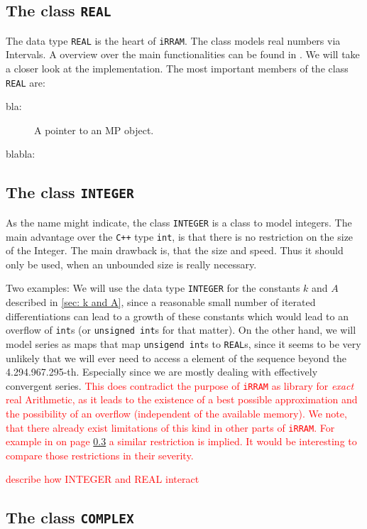 \documentclass{article}
\newcommand{\irram}{\texttt{iRRAM}\xspace}
\newcommand{\cc}{\texttt{C++}\xspace}
\newcommand{\ir}[1]{\texttt{#1}}
\newcommand{\code}[1]{\texttt{#1}}
\newcommand{\temp}[1]{\textcolor{red}{#1}}
\begin{document}
\subsection{The class \ir{REAL}}

The data type \ir{REAL} is the heart of \irram. The class models real numbers via Intervals. A overview over the main functionalities can be found in \cite{}. We will take a closer look at the implementation. The most important members of the class \ir{REAL} are:
\begin{description}
\item[bla:] A pointer to an MP object.
\item[blabla:]
\end{description}

\subsection{The class \ir{INTEGER}}

As the name might indicate, the class \ir{INTEGER} is a class to model integers. The main advantage over the \cc type \code{int}, is that there is no restriction on the size of the Integer. The main drawback is, that the size and speed. Thus it should only be used, when an unbounded size is really necessary.

Two examples: We will use the data type \ir{INTEGER} for the constants $k$ and $A$ described in \cref{sec: k and A}, since a reasonable small number of iterated differentiations can lead to a growth of these constants which would lead to an overflow of \code{int}s (or \code{unsigned int}s for that matter). On the other hand, we will model series as maps that map \code{unsigend int}s to \code{REAL}s, since it seems to be very unlikely that we will ever need to access a element of the sequence beyond the 4.294.967.295-th. Especially since we are mostly dealing with effectively convergent series. \temp{This does contradict the purpose of \irram as library for \emph{exact} real Arithmetic, as it leads to the existence of a best possible approximation and the possibility of an overflow (independent of the available memory). We note, that there already exist limitations of this kind in other parts of \irram. For example in \cite{} on page \ref{} a similar restriction is implied. It would be interesting to compare those restrictions in their severity.}

\temp{describe how INTEGER and REAL interact}

\subsection{The class \ir{COMPLEX}}
\end{document}
